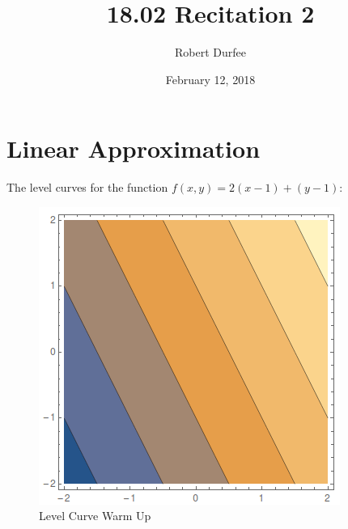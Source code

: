 \documentclass{article}
\title{ 18.02 Recitation 2 }
\author{ Robert Durfee }
\date{ February 12, 2018 }
\begin{document}
\maketitle

\section{ Linear Approximation }

The level curves for the function $f(x, y) = 2(x - 1) + (y - 1)$:

\begin{figure}[H]
  \centering
  \includegraphics[scale=0.60]{"LevelCurves"}
  \caption{Level Curve Warm Up}
\end{figure}
\end{document}
